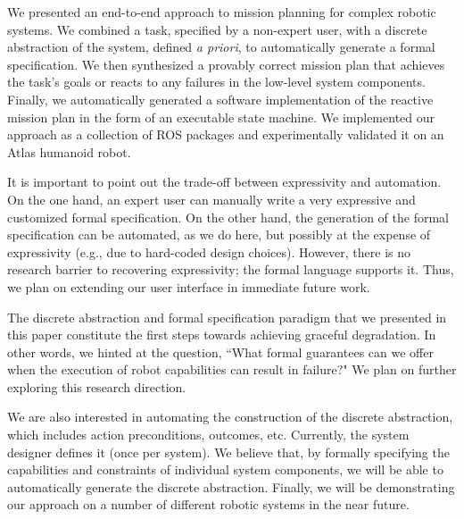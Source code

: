 
\addtolength{\textheight}{-13 pt}   %

We presented an end-to-end approach to mission planning for complex robotic systems.
We combined a task, specified by a non-expert user, with a discrete abstraction of the system, defined \emph{a priori}, to automatically generate a formal specification.
We then synthesized a provably correct mission plan that achieves the task's goals or reacts to any failures in the low-level system components.
Finally, we automatically generated a software implementation of the reactive mission plan in the form of an executable state machine.
We implemented our approach as a collection of ROS packages and experimentally validated it on an Atlas humanoid robot.

It is important to point out the trade-off between expressivity and automation.
On the one hand, an expert user can manually write a very expressive and customized formal specification.
On the other hand, the generation of the formal specification can be automated, as we do here, but possibly at the expense of expressivity (e.g., due to hard-coded design choices).
However, there is no research barrier to recovering expressivity; the formal language supports it.
Thus, we plan on extending our user interface in immediate future work.

The discrete abstraction and formal specification paradigm that we presented in this paper constitute the first steps towards achieving graceful degradation.
In other words, we hinted at the question, ``What formal guarantees can we offer when the execution of robot capabilities can result in failure?"
We plan on further exploring this research direction.

We are also interested in automating the construction of the discrete abstraction, which includes action preconditions, outcomes, etc.
Currently, the system designer defines it (once per system).
We believe that, by formally specifying the capabilities and constraints of individual system components, we will be able to automatically generate the discrete abstraction.
Finally, we will be demonstrating our approach on a number of different robotic systems in the near future.

